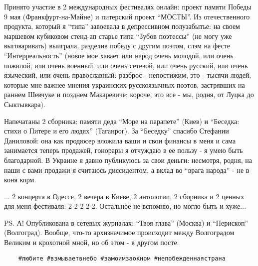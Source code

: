 Принято участие в 2 международных фестивалях онлайн: проект памяти Победы 9 мая
(Франкфурт-на-Майне) и питерский проект \enquote{МОСТЫ}. Из отечественного продукта,
который я \enquote{типа} завоевала в депрессивном полузабытье: на своем маршевом
кубиковом стенд-ап старье типа \enquote{Зубов поэтессы} (не могу уже выговаривать)
выиграла, разделив победу с другим поэтом, слэм на фесте \enquote{Интерреальность}
(новое мое хавает или народ очень молодой, или очень пожилой, или очень
военный, или очень сетевой, или очень русский, или очень языческий, или очень
православный: разброс - непостижим, это - тысячи людей, которые мне важнее
мнения украинских русскоязычных поэтов, застрявших на раннем Шевчуке и позднем
Макаревиче: короче, это все - мы, родня, от Луцка до Сыктывкара).

Напечатаны 2 сборника: памяти деда \enquote{Море на парапете} (Киев) и \enquote{Беседка: стихи
о Питере и его людях} (Таганрог). За \enquote{Беседку} спасибо Стефании Даниловой: она
как продюсер вложила ваши и свои финансы в меня и сама занимается теперь
продажей, гонорары я отчуждаю в ее пользу - я умею быть благодарной. В Украине
я давно публикуюсь за свои деньги: несмотря, родня, на наши с вами продажи я
считаюсь диссидентом, а вклад во \enquote{врага народа} - не в коня корм.

... 2 концерта в Одессе, 2 вечера в Киеве, 2 антологии, 2 сборника и 2 ценных
для меня фестиваля: 2-2-2-2-2. Остальное не вспомню, но могло быть и хуже...

PS. А! Опубликована в сетевых журналах: \enquote{Твоя глава} (Москва) и
\enquote{Перископ} (Волгоград). Вообще, что-то архизначимое происходит между
Волгоградом Великим и крохотной мной, но об этом - в другом посте. 

\begin{verbatim}
	#любите #взмываетвнебо #замоимзаокном #непобежденнаястрана
\end{verbatim}

